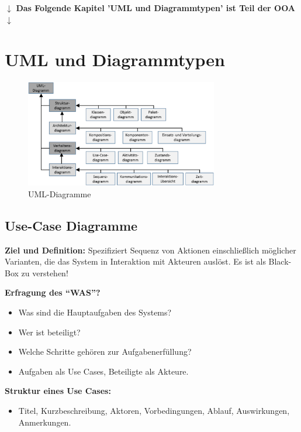 \documentclass[11pt, a4paper]{article}
\begin{document}
\vspace{5em}

\centering $ \downarrow $ \textbf{Das Folgende Kapitel 'UML und Diagrammtypen' ist Teil der OOA} $ \downarrow $


\raggedright \section{UML und Diagrammtypen}


\begin{figure}[h]
    \centering
    \includegraphics[width=0.75\textwidth]{UML-00.png}
    \caption{UML-Diagramme}
    \label{fig:UML-00}
\end{figure}


\newpage


\subsection{Use-Case Diagramme}


\noindent \textbf{Ziel und Definition:} Spezifiziert Sequenz von Aktionen einschließlich möglicher Varianten, die das System in Interaktion mit Akteuren auslöst. Es ist als Black-Box zu verstehen!

\vspace{1em}

\noindent\textbf{Erfragung des “WAS”?}
\begin{itemize}
    \item Was sind die Hauptaufgaben des Systems?
    \item Wer ist beteiligt?
    \item Welche Schritte gehören zur Aufgabenerfüllung?
    \item Aufgaben als Use Cases, Beteiligte als Akteure.
\end{itemize}

\vspace{1em}

\noindent\textbf{Struktur eines Use Cases:}
\begin{itemize}
    \item Titel, Kurzbeschreibung, Aktoren, Vorbedingungen, Ablauf, Auswirkungen, Anmerkungen.
\end{itemize}
\end{document}
